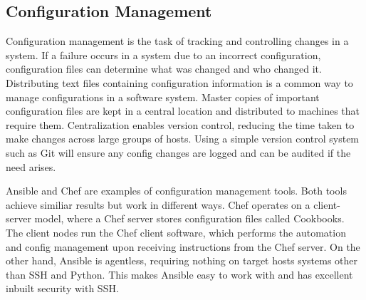 \subsection{Configuration Management}
Configuration management is the task of tracking and controlling changes in a system. If a failure occurs in a system due to an incorrect configuration, configuration files can determine what was changed and who changed it. Distributing text files containing configuration information is a common way to manage configurations in a software system. Master copies of important configuration files are kept in a central location and distributed to machines that require them. Centralization enables version control, reducing the time taken to make changes across large groups of hosts. Using a simple version control system such as Git will ensure any config changes are logged and can be audited if the need arises.

Ansible and Chef are examples of configuration management tools. Both tools achieve similiar results but work in different ways. Chef operates on a client-server model, where a Chef server stores configuration files called Cookbooks. The client nodes run the Chef client software, which performs the automation and config management upon receiving instructions from the Chef server. On the other hand, Ansible is agentless, requiring nothing on target hosts systems other than SSH and Python. This makes Ansible easy to work with and has excellent inbuilt security with SSH.
